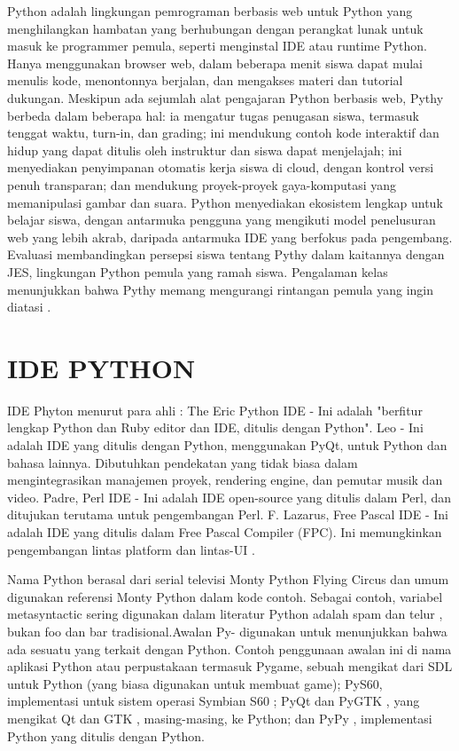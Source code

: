 	Python adalah lingkungan pemrograman berbasis web untuk Python yang menghilangkan hambatan yang berhubungan dengan perangkat lunak untuk masuk ke programmer pemula, seperti menginstal IDE atau runtime Python. Hanya menggunakan browser web, dalam beberapa menit siswa dapat mulai menulis kode, menontonnya berjalan, dan mengakses materi dan tutorial dukungan. Meskipun ada sejumlah alat pengajaran Python berbasis web, Pythy berbeda dalam beberapa hal: ia mengatur tugas penugasan siswa, termasuk tenggat waktu, turn-in, dan grading; ini mendukung contoh kode interaktif dan hidup yang dapat ditulis oleh instruktur dan siswa dapat menjelajah; ini menyediakan penyimpanan otomatis kerja siswa di cloud, dengan kontrol versi penuh transparan; dan mendukung proyek-proyek gaya-komputasi yang memanipulasi gambar dan suara. Python menyediakan ekosistem lengkap untuk belajar siswa, dengan antarmuka pengguna yang mengikuti model penelusuran web yang lebih akrab, daripada antarmuka IDE yang berfokus pada pengembang. Evaluasi membandingkan persepsi siswa tentang Pythy dalam kaitannya dengan JES, lingkungan Python pemula yang ramah siswa. Pengalaman kelas menunjukkan bahwa Pythy memang mengurangi rintangan pemula yang ingin diatasi \cite{edwards2014pythy}.\\

\section{IDE PYTHON}
IDE Phyton menurut para ahli :
The Eric Python IDE - Ini adalah "berfitur lengkap Python dan Ruby editor dan IDE, ditulis dengan Python".
Leo - Ini adalah IDE yang ditulis dengan Python, menggunakan PyQt, untuk Python dan bahasa lainnya. Dibutuhkan pendekatan yang tidak biasa dalam mengintegrasikan manajemen proyek, rendering engine, dan pemutar musik dan video.
Padre, Perl IDE - Ini adalah IDE open-source yang ditulis dalam Perl, dan ditujukan terutama untuk pengembangan Perl.
 F. Lazarus, Free Pascal IDE - Ini adalah IDE yang ditulis dalam Free Pascal Compiler (FPC). Ini memungkinkan pengembangan lintas platform dan lintas-UI \cite{swarnkar2013survey}.

Nama Python berasal dari serial televisi Monty Python Flying Circus dan umum digunakan referensi Monty Python dalam kode contoh. Sebagai contoh, variabel metasyntactic sering digunakan dalam literatur Python adalah spam dan telur , bukan foo dan bar tradisional.Awalan Py- digunakan untuk menunjukkan bahwa ada sesuatu yang terkait dengan Python. Contoh penggunaan awalan ini di nama aplikasi Python atau perpustakaan termasuk Pygame, sebuah mengikat dari SDL untuk Python (yang biasa digunakan untuk membuat game); PyS60, implementasi untuk sistem operasi Symbian S60 ; PyQt dan PyGTK , yang mengikat Qt dan GTK , masing-masing, ke Python; dan PyPy , implementasi Python yang ditulis dengan Python. \cite{van2007python}

